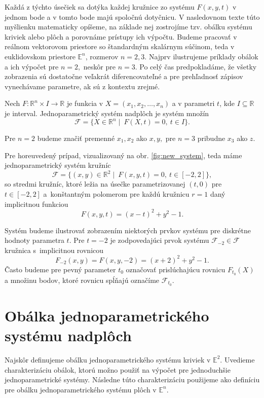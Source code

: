 Každá z týchto úsečiek sa dotýka každej kružnice zo systému $F(x,y,t)$ v jednom bode a v tomto bode majú spoločnú dotyčnicu. V nasledovnom texte túto myšlienku matematicky opíšeme, na základe nej zostrojíme tzv. obálku systému kriviek alebo plôch a porovnáme prístupy ich výpočtu. Budeme pracovať v reálnom vektorovom priestore so štandardným skalárnym súčinom, teda v euklidovskom priestore $\mathbb{E}^{n}$, rozmerov $n = 2, 3.$ Najprv ilustrujeme príklady obálok a ich výpočet pre $ n = 2,$ neskôr pre $n = 3.$ Po celý čas predpokladáme, že všetky zobrazenia sú dostatočne veľakrát diferencovateľné a pre prehľadnosť zápisov vynechávame parametre, ak sú z kontextu zrejmé.


\begin{definition}
Nech $F \colon \mathbb{R}^{n} \times I \rightarrow \mathbb{R}$ je funkcia v $ X = ( x_{1}, x_{2}, \ldots, x_{n}) $ a v parametri $t$, kde $I \subseteq \mathbb{R}$ je interval. Jednoparametrický systém nadplôch je systém množín 
$$
\mathcal{F} = \{ X \in \mathbb{R}^{n} \mid  \ F(X, t) = 0, \ t \in I \}.
$$
\end{definition}
Pre $n = 2$ budeme značiť premenné $x_{1}, x_{2}$ ako $x, y,$ pre $n = 3$ pribudne $x_{3}$ ako $z.$ 

Pre horeuvedený prípad, vizualizovaný na obr. \ref{fig:new_system}, teda máme jednoparametrický systém kružníc 
$$ \mathcal{F} = \{ (x, y) \in \mathbb{R}^{2} \mid \ F(x, y, t) = 0, \ t \in [-2,2] \}, $$
so stredmi kružníc, ktoré ležia na úsečke parametrizovanej $(t,0)$ pre $t \in [-2,2]$ a~konštantným polomerom pre každú kružnicu $r = 1$ daný implicitnou funkciou
$$ F(x, y, t) = (x - t)^2 + y^2 - 1.$$

Systém budeme ilustrovať zobrazením niektorých prvkov systému pre diskrétne hodnoty parametra $t$. Pre $t = -2$ je zodpovedajúci prvok systému $\mathcal{F}_{-2} \in \mathcal{F}$  kružnica s~implicitnou rovnicou
$$ F_{-2}(x, y) = F(x, y, -2) = (x + 2)^2 + y^2 - 1. $$
Často budeme pre pevný parameter $t_0$ označovať prislúchajúcu rovnicu $F_{t_0}(X)$ a množinu bodov, ktoré rovnicu spĺňajú označíme $\mathcal{F}_{t_0}.$

\section{Obálka jednoparametrického systému nadplôch}
Najskôr definujeme obálku jednoparametrického systému kriviek v $\mathbb{E}^2$. Uvedieme charakterizáciu obálok, ktorú možno použiť na výpočet pre jednoduchšie jednoparametrické systémy. Následne túto charakterizáciu použijeme ako definíciu pre obálku jednoparametrického systému plôch v $\mathbb{E}^n$.

